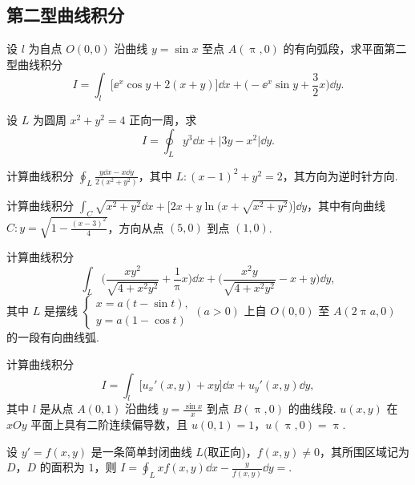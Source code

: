 \subsection{第二型曲线积分}

	\begin{ti}
		设 $l$ 为自点 $O(0,0)$ 沿曲线 $y = \sin x$ 至点 $A(\uppi,0)$ 的有向弧段，求平面第二型曲线积分
		\[
			I = \int_{l} \bigl[ \ee^{x} \cos y + 2 (x + y) \bigr] \dd{x} + \Biggl( -\ee^{x} \sin y + \frac{3}{2}x \Biggr) \dd{y}.
		\]
	\end{ti}

	\begin{ti}
		设 $L$ 为圆周 $x^{2} + y^{2} = 4$ 正向一周，求
		\[
			I = \oint_{L} y^{3} \dd{x} + \bigl| 3y - x^{2} \bigr| \dd{y}.
		\]
	\end{ti}

	\begin{ti}
		计算曲线积分 $\oint_{L} \frac{y \dd{x} - x \dd{y}}{2\left(x^{2} + y^{2}\right)}$，其中 $L: (x - 1)^{2} + y^{2} = 2$，其方向为逆时针方向.
	\end{ti}

	\begin{ti}
		计算曲线积分 $\int_{C} \sqrt{x^{2} + y^{2}} \dd{x} + \bigl[ 2x + y\ln\bigl( x + \sqrt{x^{2} + y^{2}} \bigr) \bigr] \dd{y}$，其中有向曲线 $C: y = \sqrt{1 - \frac{(x - 3)^{2}}{4}}$，方向从点 $(5,0)$ 到点 $(1,0)$.
	\end{ti}

	\begin{ti}
		计算曲线积分
		\[
			\int_{L} \Biggl( \frac{xy^{2}}{\sqrt{4 + x^{2}y^{2}}} + \frac{1}{\uppi}x \Biggr)\dd{x} + \Biggl( \frac{x^{2}y}{\sqrt{4 + x^{2}y^{2}}} - x + y \Biggr)\dd{y},
		\]
		其中 $L$ 是摆线 $\begin{cases}
			x = a (t - \sin t),\\
			y = a (1 - \cos t)
		\end{cases} (a > 0)$ 上自 $O(0,0)$ 至 $A(2\uppi a,0)$ 的一段有向曲线弧.
	\end{ti}

	\begin{ti}
		计算曲线积分
		\[
			I = \int_{l} \bigl[ u_{x}'(x,y) + xy \bigr] \dd{x} + u_{y}'(x,y) \dd{y},
		\]
		其中 $l$ 是从点 $A(0,1)$ 沿曲线 $y = \frac{\sin x}{x}$ 到点 $B(\uppi,0)$ 的曲线段. $u(x,y)$ 在 $xOy$ 平面上具有二阶连续偏导数，且 $u(0,1) = 1$，$u(\uppi,0) = \uppi$.
	\end{ti}

	\begin{ti}
		设 $y' = f(x,y)$ 是一条简单封闭曲线 $L$(取正向)，$f(x,y) \ne 0$，其所围区域记为 $D$，$D$ 的面积为 $1$，则 $I = \oint_{L} xf(x,y) \dd{x} - \frac{y}{f(x,y)} \dd{y} = $\htwo.
	\end{ti}

